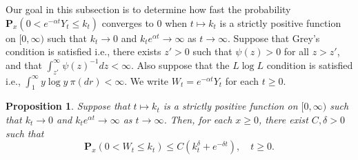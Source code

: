 \documentclass[12pt,a4paper]{amsart}
\theoremstyle{plain}
\newtheorem{prop}[thm]{Proposition}
\theoremstyle{definition}
\numberwithin{equation}{section}
\begin{document}
Our goal in this subsection is to determine how fast the probability $\mathbf P_x(0<e^{-\alpha t}Y_t \leq k_t)$ converges to $0$ when $t\mapsto k_t$ is a strictly positive function on $[0,\infty)$ such that $k_t \to 0$ and $k_t e^{\alpha t} \to \infty$ as $t\to \infty$.
Suppose that Grey's condition is satisfied i.e., there exists $z' > 0$ such that $\psi(z) > 0$ for all $z>z'$, and that $\int_{z'}^\infty \psi(z)^{-1}dz < \infty$.
Also suppose that the $L \log L$ condition is satisfied i.e.,
$
  \int_1^\infty y \log y~\pi(dr)
 < \infty.
$
We write $W_t = e^{-\alpha t}Y_t$ for each $t\geq 0$.

\begin{prop}
  \label{lem: control of XT}
  Suppose that $t\mapsto k_t$ is a strictly positive function on $[0,\infty)$ such that $k_t \to 0$ and $k_t e^{\alpha t} \to \infty$ as $t\to \infty$.
  Then, for each $x\geq 0$, there exist $C,\delta>0$ such that
  \[
    \mathbf P_x(0<W_t\leq k_t)
    \leq C(k_t^\delta + e^{-\delta t}), \quad t\geq 0.
  \]
\end{prop}
\end{document}
